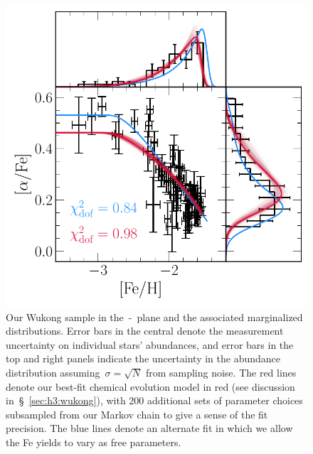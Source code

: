 \documentclass[ms.tex]{subfiles}
\begin{document}
\begin{figure}
\centering
\includegraphics[scale = 0.65]{wukong_bestfit.pdf}
\caption{
Our Wukong sample in the~\afe-\feh~plane and the associated marginalized
distributions.
Error bars in the central denote the measurement uncertainty on individual
stars' abundances, and error bars in the top and right panels indicate the
uncertainty in the abundance distribution assuming~$\sigma = \sqrt{N}$ from
sampling noise.
The red lines denote our best-fit chemical evolution model in red (see
discussion in~\S~\ref{sec:h3:wukong}), with 200 additional sets of parameter
choices subsampled from our Markov chain to give a sense of the fit precision.
The blue lines denote an alternate fit in which we allow the Fe yields to vary
as free parameters.
}
\label{fig:wukong}
\end{figure}
\end{document}
